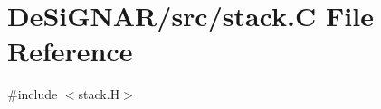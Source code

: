 \hypertarget{stack_8_c}{}\section{De\+Si\+G\+N\+A\+R/src/stack.C File Reference}
\label{stack_8_c}
{\ttfamily \#include $<$stack.\+H$>$}\newline
